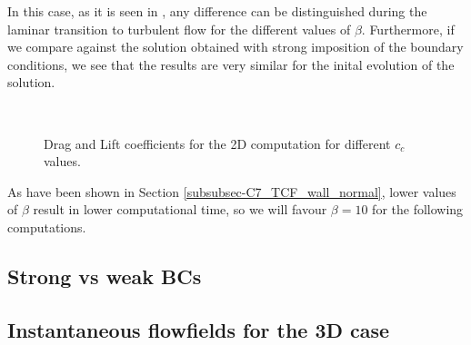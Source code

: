 In this case, as it is seen in , any difference can be distinguished during the laminar transition to turbulent flow for the different values of $ \beta $. Furthermore, if we compare against the solution obtained with strong imposition of the boundary conditions, we see that the results are very similar for the inital evolution of the solution.
\begin{figure}[h!]
  \centering
  \\
  \caption{Drag and Lift coefficients for the 2D computation for different $ c_c $ values.}
  \label{fig-NACA_b_drag_lift}
\end{figure}
As have been shown in Section \ref{subsubsec-C7_TCF_wall_normal}, lower values of $ \beta $ result in lower computational time, so we will favour $ \beta=10 $ for the following computations.

\subsection{Strong vs weak BCs}
\subsection{Instantaneous flowfields for the 3D case}
